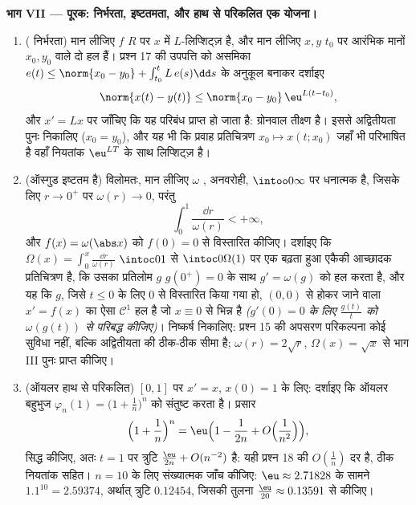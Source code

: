 \begin{problem}[{सप्ताहांत समस्या --- लिप्शिट्ज़ के बिना $x' = f(t, x)$ के
हलों का अस्तित्व}]
\medskip
\noindent\textbf{भाग VII --- पूरक: निर्भरता, इष्टतमता, और हाथ से
परिकलित एक योजना।}
\begin{enumerate}[resume]
  \item ( निर्भरता) मान लीजिए $f$ $R$ पर $x$ में
        $L$-लिप्शिट्ज़ है, और मान लीजिए $x, y$ $t_0$ पर आरंभिक
        मानों $x_0, y_0$ वाले दो हल हैं। प्रश्न 17 की उपपत्ति को
        असमिका $e(t) \leq \norm{x_0
        - y_0} + \int_{t_0}^tL\,e(s)\dd s$ के अनुकूल बनाकर दर्शाइए
        \[
        \norm{x(t) - y(t)} \leq \norm{x_0 - y_0}\,
        \eu^{L(t - t_0)},
        \]
        और $x' = Lx$ पर जाँचिए कि यह परिबंध प्राप्त हो जाता है:
        ग्रोनवाल तीक्ष्ण है। इससे अद्वितीयता पुनः निकालिए
        ($x_0 =
        y_0$), और यह भी कि प्रवाह प्रतिचित्रण $x_0 \mapsto x(t; x_0)$ जहाँ भी
        परिभाषित है वहाँ नियतांक $\eu^{LT}$ के साथ लिप्शिट्ज़ है।
  \item (ऑस्गुड इष्टतम है) विलोमतः, मान लीजिए $\omega$ ,
        अनवरोही, $\intoo0\infty$ पर धनात्मक है, जिसके लिए $r \to 0^+$ पर $\omega(r) \to 0$,
        परंतु
        \[
        \int_0^1\frac{\dd r}{\omega(r)} < +\infty,
        \]
        और $f(x) = \omega(\abs x)$ को $f(0) = 0$ से विस्तारित कीजिए। दर्शाइए कि $\Omega(x) = \int_0^x\frac{\dd r}{\omega(r)}$
        $\intoc0{1}$ से $\intoc0{\Omega(1)}$ पर एक बढ़ता हुआ एकैकी आच्छादक प्रतिचित्रण
        है, कि उसका प्रतिलोम $g$ $g(0^+) = 0$ के साथ $g'
        = \omega(g)$ को हल करता
        है, और यह कि $g$, जिसे $t \leq 0$ के लिए $0$ से विस्तारित
        किया गया हो, $(0, 0)$ से होकर जाने वाला $x' = f(x)$ का ऐसा $\mathcal C^1$
        हल है जो $x \equiv
        0$ से भिन्न है \emph{($g'(0) = 0$ के लिए $\frac{g(t)}t$ को
        $\omega(g(t))$ से परिबद्ध कीजिए)}। निष्कर्ष निकालिए: प्रश्न 15 की
        अपसरण परिकल्पना कोई सुविधा नहीं, बल्कि अद्वितीयता की
        ठीक-ठीक सीमा है; $\omega(r) = 2\sqrt r$, $\Omega(x) = \sqrt x$ से भाग III पुनः प्राप्त
        कीजिए।
  \item (ऑयलर हाथ से परिकलित) $[0, 1]$ पर $x' = x$, $x(0) = 1$ के लिए:
        दर्शाइए कि ऑयलर बहुभुज $\varphi_n(1) = \bigl(1 + \frac1n\bigr)^n$ को संतुष्ट करता है। प्रसार
        \[
        \Bigl(1 + \frac1n\Bigr)^{n}
        = \eu\Bigl(1 - \frac1{2n} + O\Bigl(\frac1{n^2}\Bigr)
        \Bigr),
        \]
        सिद्ध कीजिए, अतः $t = 1$ पर त्रुटि $\frac{\eu}{2n} +
        O(n^{-2})$ है: यही प्रश्न 18
        की $O(\frac1n)$ दर है, ठीक नियतांक सहित। $n = 10$ के लिए संख्यात्मक
        जाँच कीजिए: $\eu \approx 2.71828$ के सामने $1.1^{10} = 2.59374$, अर्थात् त्रुटि $0.12454$,
        जिसकी तुलना $\frac{\eu}{20}
        \approx 0.13591$ से कीजिए।
\end{enumerate}
\end{problem}

